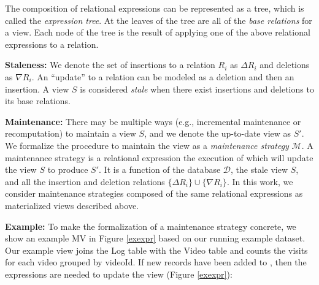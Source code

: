 The composition of relational expressions can be represented as a tree, which is called the \emph{expression tree}.
At the leaves of the tree are all of the \emph{base relations} for a view.
Each node of the tree is the result of applying one of the above relational expressions to a relation.

\vspace{.25em}

\noindent \textbf{Staleness: } We denote the set of insertions to a relation $R_i$ as $\Delta R_i$ and deletions as $\nabla R_i$.
An ``update'' to a relation can be modeled as a deletion and then an insertion.
A view $S$ is considered \emph{stale} when there exist insertions and deletions to its base relations.

\vspace{.25em}

\noindent \textbf{Maintenance: } There may be multiple ways (e.g., incremental maintenance or recomputation) to maintain a view $S$, and we denote the up-to-date view as $S'$.
We formalize the procedure to maintain the view as a \emph{maintenance strategy} $\mathcal{M}$.
A maintenance strategy is a relational expression the execution of which will update the view $S$ to produce $S'$.
It is a function of the database $\mathcal{D}$, the stale view $S$, and all the insertion and deletion relations $\{\Delta R_i\} \cup \{\nabla R_i\}$. 
In this work, we consider maintenance strategies composed of the same relational expressions as materialized views described above.



\vspace{.25em}

\noindent \textbf{Example: }
To make the formalization of a maintenance strategy concrete, we show an example MV in Figure \ref{exexpr} based on our running example dataset.
Our example view joins the Log table with the Video table and counts the visits for each video grouped by \textsf{videoId}.
If new records have been added to , then the expressions are needed to update the view (Figure \ref{exexpr}):

